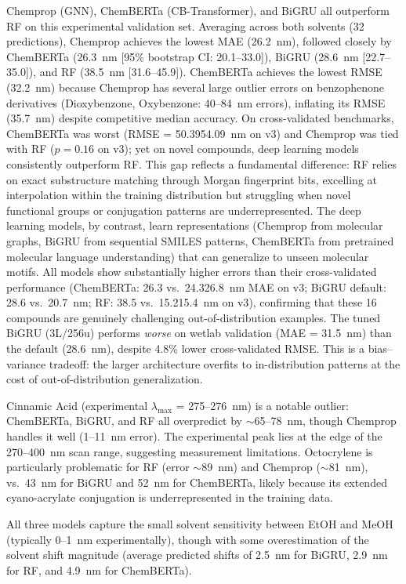 \documentclass[journal=jcisd8,manuscript=article]{achemso}
\newcommand{\added}[1]{{\color{addedblue}#1}}
\newcommand{\removed}[1]{{\color{removedred}#1}}
\begin{document}
Chemprop (GNN), ChemBERTa (CB-Transformer), and BiGRU all outperform RF on this experimental validation set. Averaging across both solvents (32 predictions), Chemprop achieves the lowest MAE (26.2~nm), followed closely by ChemBERTa (26.3~nm [95\% bootstrap CI: 20.1--33.0]), BiGRU (28.6~nm [22.7--35.0]), and RF (38.5~nm [31.6--45.9]).
ChemBERTa achieves the lowest RMSE (32.2~nm) because Chemprop has several large outlier errors on benzophenone derivatives (Dioxybenzone, Oxybenzone: 40--84~nm errors), inflating its RMSE (35.7~nm) despite competitive median accuracy.
On cross-validated benchmarks, ChemBERTa was worst (RMSE = \removed{50.39}\added{54.09}~nm\added{ on v3}) and Chemprop was tied with RF\added{ ($p = 0.16$ on v3)}; yet on novel compounds, deep learning models consistently outperform RF.
This gap reflects a fundamental difference: RF relies on exact substructure matching through Morgan fingerprint bits, excelling at interpolation within the training distribution but struggling when novel functional groups or conjugation patterns are underrepresented.
The deep learning models, by contrast, learn representations (Chemprop from molecular graphs, BiGRU from sequential SMILES patterns, ChemBERTa from pretrained molecular language understanding) that can generalize to unseen molecular motifs.
All models show substantially higher errors than their cross-validated performance (ChemBERTa: 26.3 vs.\ \removed{24.3}\added{26.8}~nm MAE\added{ on v3}; BiGRU default: 28.6 vs.\ 20.7~nm; RF: 38.5 vs.\ \removed{15.2}\added{15.4}~nm \added{on v3}), confirming that these 16 compounds are genuinely challenging out-of-distribution examples.
The tuned BiGRU (3L/256u) performs \textit{worse} on wetlab validation (MAE = 31.5~nm) than the default (28.6~nm), despite 4.8\% lower cross-validated RMSE. This is a bias--variance tradeoff: the larger architecture overfits to in-distribution patterns at the cost of out-of-distribution generalization.

Cinnamic Acid (experimental $\lambda_{\max}$ = 275--276~nm) is a notable outlier: ChemBERTa, BiGRU, and RF all overpredict by $\sim$65--78~nm, though Chemprop handles it well (1--11~nm error).
The experimental peak lies at the edge of the 270--400~nm scan range, suggesting measurement limitations.
Octocrylene is particularly problematic for RF (error $\sim$89~nm) and Chemprop ($\sim$81~nm), vs.\ 43~nm for BiGRU and 52~nm for ChemBERTa, likely because its extended cyano-acrylate conjugation is underrepresented in the training data.

All three models capture the small solvent sensitivity between EtOH and MeOH (typically 0--1~nm experimentally), though with some overestimation of the solvent shift magnitude (average predicted shifts of 2.5~nm for BiGRU, 2.9~nm for RF, and 4.9~nm for ChemBERTa).
\end{document}
